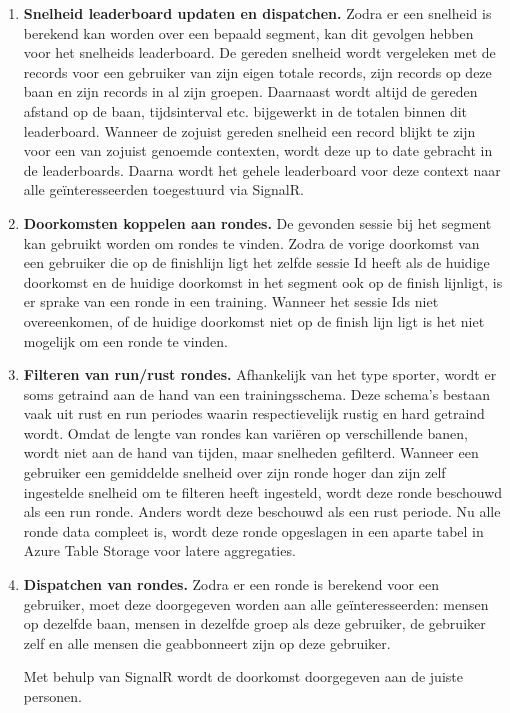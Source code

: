 \begin{enumerate}
\item \textbf{Snelheid leaderboard updaten en dispatchen.}
Zodra er een snelheid is berekend kan worden over een bepaald segment, kan dit gevolgen hebben voor het snelheids leaderboard. De gereden snelheid wordt vergeleken met de records voor een gebruiker van zijn eigen totale records, zijn records op deze baan en zijn records in al zijn groepen. Daarnaast wordt altijd de gereden afstand op de baan, tijdsinterval etc. bijgewerkt in de totalen binnen dit leaderboard. Wanneer de zojuist gereden snelheid een record blijkt te zijn voor een van zojuist genoemde contexten, wordt deze up to date gebracht in de leaderboards. Daarna wordt het gehele leaderboard voor deze context naar alle geïnteresseerden toegestuurd via SignalR.

\item \textbf{Doorkomsten koppelen aan rondes.}
De gevonden sessie bij het segment kan gebruikt worden om rondes te vinden. Zodra de vorige doorkomst van een gebruiker die op de finishlijn ligt het zelfde sessie Id heeft als de huidige doorkomst en de huidige doorkomst in het segment ook op de finish lijnligt, is er sprake van een ronde in een training. 
Wanneer het sessie Ids niet overeenkomen, of de huidige doorkomst niet op de finish lijn ligt is het niet mogelijk om een ronde te vinden.

\item \textbf{Filteren van run/rust rondes.}
Afhankelijk van het type sporter, wordt er soms getraind aan de hand van een trainingsschema. Deze schema's bestaan vaak uit rust en run periodes waarin respectievelijk rustig en hard getraind wordt. Omdat de lengte van rondes kan variëren op verschillende banen, wordt niet aan de hand van tijden, maar snelheden gefilterd. Wanneer een gebruiker een gemiddelde snelheid over zijn ronde hoger dan zijn zelf ingestelde snelheid om te filteren heeft ingesteld, wordt deze ronde beschouwd als een run ronde. Anders wordt deze beschouwd als een rust periode. Nu alle ronde data compleet is, wordt deze ronde opgeslagen in een aparte tabel in Azure Table Storage voor latere aggregaties.

\item \textbf{Dispatchen van rondes.}
Zodra er een ronde is berekend voor een gebruiker, moet deze doorgegeven worden aan alle geïnteresseerden: mensen op dezelfde baan, mensen in dezelfde groep als deze gebruiker, de gebruiker zelf en alle mensen die geabbonneert zijn op deze gebruiker.

Met behulp van SignalR wordt de doorkomst doorgegeven aan de juiste personen.


\end{enumerate}
